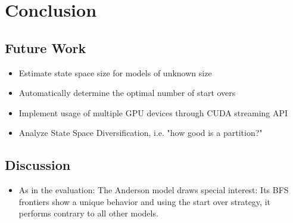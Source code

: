 \documentclass[
fancyheadings, %
%
%
]{stsreprt}
\begin{document}
\chapter{Conclusion}

\section{Future Work}

\begin{itemize}
    \item Estimate state space size for models of unknown size
    \item Automatically determine the optimal number of start overs
    \item Implement usage of multiple GPU devices through CUDA streaming API
    \item Analyze State Space Diversification, i.e. "how good is a partition?"
\end{itemize}

\section{Discussion}

\begin{itemize}
    \item As in the evaluation: The Anderson model draws special interest: Its BFS frontiers show a unique behavior and using the start over strategy, it performs contrary to all other models.
\end{itemize}



\backmatter

\printbibliography[heading=bibintoc]
\end{document}
